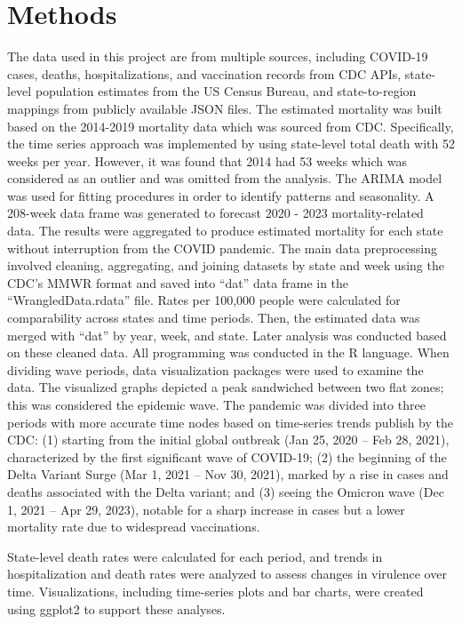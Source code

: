 \documentclass[
  letterpaper,
  DIV=11,
  numbers=noendperiod]{scrartcl}
\begin{document}
\section{Methods}\label{methods}

The data used in this project are from multiple sources, including
COVID-19 cases, deaths, hospitalizations, and vaccination records from
CDC APIs, state-level population estimates from the US Census Bureau,
and state-to-region mappings from publicly available JSON files. The
estimated mortality was built based on the 2014-2019 mortality data
which was sourced from CDC. Specifically, the time series approach was
implemented by using state-level total death with 52 weeks per year.
However, it was found that 2014 had 53 weeks which was considered as an
outlier and was omitted from the analysis. The ARIMA model was used for
fitting procedures in order to identify patterns and seasonality. A
208-week data frame was generated to forecast 2020 - 2023
mortality-related data. The results were aggregated to produce estimated
mortality for each state without interruption from the COVID pandemic.
The main data preprocessing involved cleaning, aggregating, and joining
datasets by state and week using the CDC's MMWR format and saved into
``dat'' data frame in the ``WrangledData.rdata'' file. Rates per 100,000
people were calculated for comparability across states and time periods.
Then, the estimated data was merged with ``dat'' by year, week, and
state. Later analysis was conducted based on these cleaned data. All
programming was conducted in the R language. When dividing wave periods,
data visualization packages were used to examine the data. The
visualized graphs depicted a peak sandwiched between two flat zones;
this was considered the epidemic wave. The pandemic was divided into
three periods with more accurate time nodes based on time-series trends
publish by the CDC: (1) starting from the initial global outbreak (Jan
25, 2020 -- Feb 28, 2021), characterized by the first significant wave
of COVID-19; (2) the beginning of the Delta Variant Surge (Mar 1, 2021
-- Nov 30, 2021), marked by a rise in cases and deaths associated with
the Delta variant; and (3) seeing the Omicron wave (Dec 1, 2021 -- Apr
29, 2023), notable for a sharp increase in cases but a lower mortality
rate due to widespread vaccinations.

State-level death rates were calculated for each period, and trends in
hospitalization and death rates were analyzed to assess changes in
virulence over time. Visualizations, including time-series plots and bar
charts, were created using ggplot2 to support these analyses.
\end{document}
